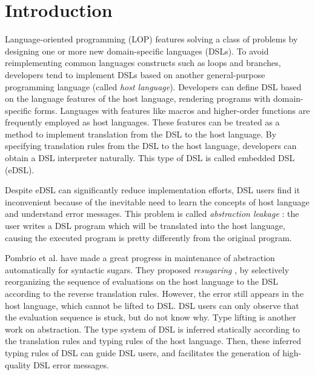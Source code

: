 \section{Introduction}

Language-oriented programming (LOP) \cite{LOP} features solving a class of problems by designing one or more new domain-specific languages (DSLs).
To avoid reimplementing common languages constructs such as loops and branches,
developers tend to implement DSLs based on another general-purpose programming language (called \textit{host language}).
Developers can define DSL based on the language features of the host language, rendering programs with domain-specific forms.
Languages with features like macros and higher-order functions are frequently employed as host languages\cite{macro-dsl,macro-dsl-2}.
These features can be treated as a method to implement translation from the DSL to the host language.
By specifying translation rules from the DSL to the host language, developers can obtain a DSL interpreter naturally.
This type of DSL is called embedded DSL (eDSL).

Despite eDSL can significantly reduce implementation efforts, DSL users find it inconvenient because of the inevitable need to learn the concepts of host language and understand error messages.
This problem is called \textit{abstraction leakage} \cite{Abstraction}:
 the user writes a DSL program which will be translated into the host language,
 causing the executed program is pretty differently from the original program.

Pombrio et al. have made a great progress in maintenance of abstraction automatically for syntactic sugars.
They proposed \textit{resugaring} \cite{resugar}, by selectively reorganizing the sequence of evaluations on the host language to the DSL according to the reverse translation rules.
However, the error still appears in the host language, which cannot be lifted to DSL.
DSL users can only observe that the evaluation sequence is stuck, but do not know why. 
Type lifting \cite{infer-types} is another work on abstraction.
The type system of DSL is inferred statically according to the translation rules and typing rules of the host language.
Then, these inferred typing rules of DSL can guide DSL users,
 and facilitates the generation of high-quality DSL error messages.

